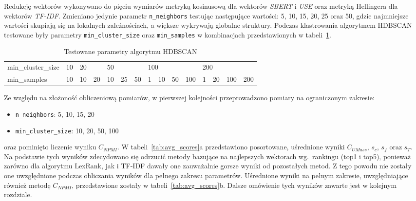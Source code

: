 	Redukcję wektorów wykonywano do pięciu wymiarów metryką kosinusową dla wektorów \emph{SBERT} i \emph{USE} oraz metryką Hellingera dla wektorów \emph{TF-IDF}.
	Zmieniano jedynie parametr \verb|n_neighbors| testując następujące wartości: 5, 10, 15, 20, 25 oraz 50, gdzie najmniejsze wartości skupiają się na lokalnych zależnościach,
		a większe wykrywają globalne struktury.
	Podczas klastrowania algorytmem HDBSCAN testowane były parametry \verb|min_cluster_size| oraz \verb|min_samples| w kombinacjach przedstawionych w tabeli~\ref{tab:hdbscan_params}.

	\begin{table}[htb]
		\caption{Testowane parametry algorytmu HDBSCAN}\label{tab:hdbscan_params}
		\centering
		\begin{tabular}{lrrrrrrrrrrrrrr}
			\toprule
			min\_cluster\_size	& 10 & \multicolumn{2}{l}{20} &  \multicolumn{3}{l}{50} & \multicolumn{4}{l}{100}	&  \multicolumn{4}{l}{200} \\
			min\_samples 				& 10 &  10 &  20 							&  10 &  25 &  50 				& 	1 &	10 &	50 &  100		&   1 &   20 &  100 &  200 \\
			\bottomrule
		\end{tabular}
	\end{table}

	Ze względu na złożoność obliczeniową pomiarów, w pierwszej kolejności przeprowadzono pomiary na ograniczonym zakresie:
	\begin{itemize}
		\item \verb|n_neighbors|: 5, 10, 15, 20
		\item \verb|min_cluster_size|: 10, 20, 50, 100
	\end{itemize}
	oraz pominięto liczenie wyniku \(C_{NPMI}\).
	W tabeli~\ref{tab:avg_scores}a przedstawiono posortowane, uśrednione wyniki \(C_{UMass}\), \(s_c\), \(s_f\) oraz \(s_T\).
	Na podstawie tych wyników zdecydowano się odrzucić metody bazujące na najlepszych wektorach wg.\ rankingu (top1 i top5),
		ponieważ zarówno dla algorytmu LexRank, jak i TF-IDF dawały one zauważalnie gorsze wyniki od pozostałych metod.
	Z tego powodu nie zostały one uwzględnione podczas obliczania wyników dla pełnego zakresu parametrów.
	Uśrednione wyniki na pełnym zakresie, uwzględniające również metodę \(C_{NPMI}\), przedstawione zostały w tabeli~\ref{tab:avg_scores}b.
	Dalsze omówienie tych wyników zawarte jest w kolejnym rozdziale.
		
